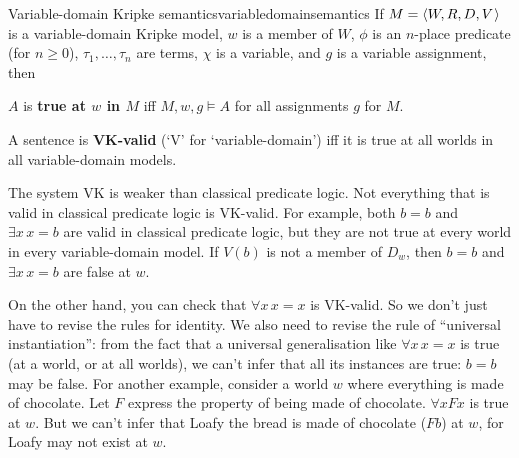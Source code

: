 \begin{definition}{Variable-domain Kripke semantics}{variabledomainsemantics}
  If $\Mfr = \t{W,R,D,V}$ is a variable-domain Kripke model, $w$ is a member of
  $W$, $\phi$ is an $n$-place predicate (for $n\geq 0$), $\tau_1,\ldots,\tau_n$
  are terms, $\chi$ is a variable, and $g$ is a variable assignment, then
  
  
  \medskip
  \begin{semantics}
  \end{semantics}

  \medskip
  $A$ is \textbf{true at $w$ in $M$} iff $M,w,g \models A$ for all assignments
  $g$ for $M$.
\end{definition}

A sentence is \textbf{VK-valid} (`V' for `variable-domain') iff it is true at all
worlds in all variable-domain models.

The system VK is weaker than classical predicate logic. Not everything
that is valid in classical predicate logic is VK-valid. For example, both $b=b$
and $\exists x\, x\!=\!b$ are valid in classical predicate logic, but they are
not true at every world in every variable-domain model. If $V(b)$ is not a
member of $D_w$, then $b=b$ and $\exists x \, x\!=\!b$ are false at $w$.

On the other hand, you can check that $\forall x\, x\!=\!x$ is VK-valid. So we
don't just have to revise the rules for identity. We also need to revise the
rule of ``universal instantiation'': from the fact that a universal
generalisation like $\forall x\, x\!=\!x$ is true (at a world, or at all worlds),
we can't infer that all its instances are true: $b=b$ may be false. For another
example, consider a world $w$ where everything is made of chocolate. Let $F$
express the property of being made of chocolate. $\forall x Fx$ is true at $w$.
But we can't infer that Loafy the bread is made of chocolate ($Fb$) at $w$, for
Loafy may not exist at $w$.

